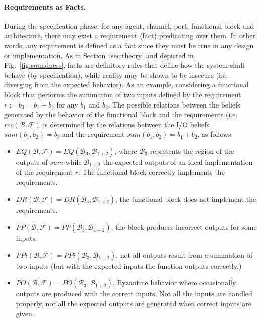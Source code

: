 \documentclass[runningheads]{llncs}
\newcommand{\beliefRegion}{\mathcal{B}}
\newcommand{\factRegion}{\mathcal{F}}
\newcommand{\Rcc}[2]{rcc(#1,#2)}
\newcommand{\eq}[2]{EQ(#1,#2)}
\newcommand{\pp}[2]{PP(#1,#2)}
\newcommand{\po}[2]{PO(#1,#2)}
\newcommand{\ppi}[2]{PPi(#1,#2)}
\newcommand{\dr}[2]{DR(#1,#2)}
\begin{document}
\paragraph{Requirements as Facts.}
During the specification phase, for any agent, channel, port, functional block
and architecture, there may exist a requirement (fact) predicating over them.
In other words, any requirement is defined as a fact since they must be true in
any design or implementation. As in Section~\ref{sec:theory} and depicted in
Fig.~\ref{fig:soundness}, facts are definitory rules that define how
the system shall behave (by specification), while reality may be shown to
be insecure (i.e. diverging from the expected behavior).
As an example, considering a functional block that performs the summation of two
inputs defined by the requirement $r := b_3 = b_1
+ b_2$ for any $b_1$ and $b_2$. The possible relations between the beliefs generated by the behavior of the functional block and
the requirements (i.e. $\Rcc{\beliefRegion}{\factRegion}$ is determined by
the relations between the I/O beliefs $sum(b_1,b_2)=b_3$ and the requirement
$sum(b_1,b_2)=b_1+b_2$, as follows.
\begin{itemize}
	\item $\eq{\beliefRegion}{\factRegion}=\eq{\beliefRegion_3}{\beliefRegion_{1+2}}$, 
		where $\beliefRegion_3$ represents the region of the
		outputs of $sum$ while
		$\beliefRegion_{1+2}$ the expected
		outputs of an ideal implementation of the requirement $r$.
		The functional block correctly implements the
		requirements.
	\item
		$\dr{\beliefRegion}{\factRegion}=\dr{\beliefRegion_3}{\beliefRegion_{1+2}}$,
		the functional block does not implement the requirements.
	\item
		$\pp{\beliefRegion}{\factRegion}=\pp{\beliefRegion_3}{\beliefRegion_{1+2}}$, the block produces incorrect outputs for some inputs.
  \item $\ppi{\beliefRegion}{\factRegion}=\ppi{\beliefRegion_3}{\beliefRegion_{1+2}}$, not all outputs result from a summation of two inputs (but with the expected inputs the function outputs correctly.)
	\item
		$\po{\beliefRegion}{\factRegion}=\po{\beliefRegion_3}{\beliefRegion_{1+2}}$,
		Byzantine behavior where occasionally
		outputs are produced with the correct inputs. Not all
		the inputs are handled properly, nor all the expected outputs
		are generated when correct inputs are given.
\end{itemize}
\end{document}
